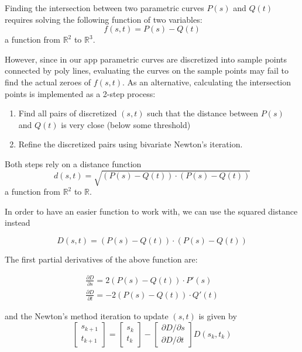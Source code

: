 \documentclass[11pt]{article}
\begin{document}
Finding the intersection between two parametric curves $P(s)$ and $Q(t)$ requires solving
the following function of two variables:
$$f(s,t) = P(s) - Q(t)$$
a function from $\mathbb{R}^2$ to $\mathbb{R}^3$.


However, since in our app parametric curves are discretized into sample points connected by poly lines, evaluating the curves
on the sample points may fail to find the actual zeroes of $f(s,t)$. As an alternative, calculating the intersection
points is implemented as a 2-step process:

\begin{enumerate}
  \item Find all pairs of discretized $(s,t)$ such that the distance between $P(s)$ and $Q(t)$ is very close (below some threshold)
  \item Refine the discretized pairs using bivariate Newton's iteration.
\end{enumerate}

Both steps rely on a distance function
$$d(s,t) = \sqrt{(P(s) - Q(t)) \cdot (P(s)-Q(t))}$$
a function from $\mathbb{R}^2$ to $\mathbb{R}$.

In order to have an easier function to work with, we can use the squared distance instead

$$D(s,t) = (P(s) - Q(t)) \cdot (P(s)-Q(t))$$

The first partial derivatives of the above function are:

\begin{align}
  \frac{\partial D}{\partial s} = 2(P(s) - Q(t)) \cdot P'(s) \\
  \frac{\partial D}{\partial t} = -2(P(s) - Q(t)) \cdot Q'(t)
\end{align}

and the Newton's method iteration to update $(s,t)$ is given by
$$
  \begin{bmatrix}
    s_{k+1} \\t_{k+1}
  \end{bmatrix}
  =
  \begin{bmatrix}
    s_{k} \\t_{k}
  \end{bmatrix}
  -
  \begin{bmatrix}
    \partial D/\partial s \\
    \partial D/\partial t
  \end{bmatrix}
  D(s_k,t_k)
$$
\end{document}
